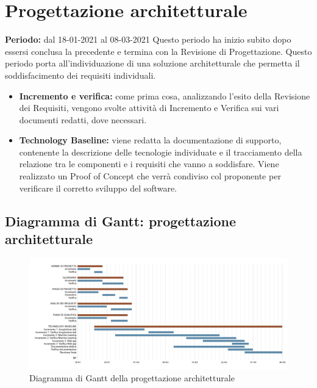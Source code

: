 \section{Progettazione architetturale}\label{4.3}
\textbf{Periodo:} dal 18-01-2021 al 08-03-2021
Questo periodo ha inizio subito dopo essersi conclusa la precedente e termina con la Revisione di Progettazione.
Questo periodo porta all'individuazione di una soluzione architetturale che permetta il soddisfacimento dei requisiti individuali.
\begin{itemize}
	\item \textbf{Incremento e verifica:} come prima cosa, analizzando l'esito della Revisione dei Requisiti, vengono svolte attività di Incremento e Verifica sui vari documenti redatti, dove necessari.
	\item \textbf{Technology Baseline:} viene redatta la documentazione di supporto, contenente la descrizione delle tecnologie individuate e il tracciamento della relazione tra le componenti e i requisiti che vanno a soddisfare.
	Viene realizzato un Proof of Concept che verrà condiviso col proponente per verificare il corretto sviluppo del software.
\end{itemize}
\subsection{Diagramma di Gantt: progettazione architetturale}\label{4.3.1}
\begin{figure}[!ht]
	\begin{center}
		\includegraphics[width=0.8\linewidth]{../immagini/gantt_progettazione_architetturale.png}
		\caption{Diagramma di Gantt della progettazione architetturale}
	\end{center}
\end{figure}
